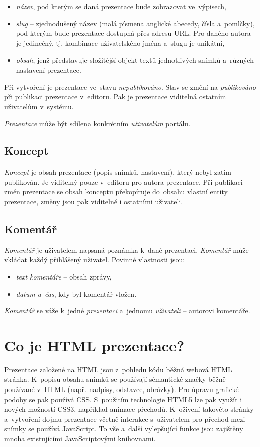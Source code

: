 \documentclass[11pt,twoside,a4paper]{book}
\newcommand*{\nom}[2]{#1\nomenclature{#1}{#2}} 			%
\begin{document}
\begin{itemize}
	\item \textit{název}, pod kterým se daná prezentace bude zobrazovat ve~výpisech,
	\item \textit{slug} – zjednodušený název (malá písmena anglické abecedy, čísla a~pomlčky), pod kterým bude prezentace dostupná přes adresu URL. Pro daného autora je jedinečný, tj. kombinace uživatelského jména a~slugu je unikátní,
	\item \textit{obsah}, jenž představuje složitější objekt textů jednotlivých snímků a~různých nastavení prezentace.
\end{itemize}

Při vytvoření je prezentace ve~stavu \textit{nepublikováno}. Stav se změní na \textit{publikováno} při publikaci prezentace v~editoru. Pak je prezentace viditelná ostatním uživatelům v~systému.

\textit{Prezentace} může být sdílena konkrétním \textit{uživatelům} portálu.


\subsection{Koncept}
\textit{Koncept} je obsah prezentace (popis snímků, nastavení), který nebyl zatím publikován. Je viditelný pouze v~editoru pro autora prezentace. Při publikaci změn prezentace se obsah konceptu překopíruje do~obsahu vlastní entity prezentace, změny jsou pak viditelné i ostatními uživateli.


\subsection{Komentář}
\textit{Komentář} je uživatelem napsaná poznámka k~dané prezentaci. \textit{Komentář} může vkládat každý přihlášený uživatel. Povinné vlastnosti jsou:

\begin{itemize}
	\item \textit{text komentáře} – obsah zprávy,
	\item \textit{datum a~čas}, kdy byl komentář vložen.
\end{itemize}

\textit{Komentář} se váže k~jedné \textit{prezentaci} a~jednomu \textit{uživateli} – autorovi komentáře.



\section{Co je HTML prezentace?}
Prezentace založené na HTML jsou z~pohledu kódu běžná webová HTML stránka. K~popisu obsahu snímků se používají sémantické značky běžně používané v~HTML (např. nadpisy, odstavce, obrázky). Pro úpravu grafické podoby se pak používá \nom{CSS}{Cascading Style Sheets}. S~použitím technologie HTML5 lze pak využít i nových možností CSS3, například animace přechodů. K~oživení takovéto stránky a~vytvoření dojmu prezentace včetně interakce s~uživatelem pro přechod mezi snímky se používá Java\-Script. To vše a~další vylepšující funkce jsou zajištěny mnoha existujícími Java\-Scriptovými knihovnami.
\end{document}
